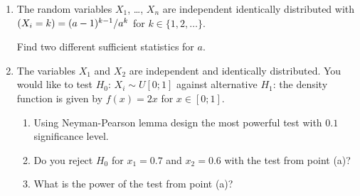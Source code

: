 \documentclass[12pt]{article}
\let\P\relax
\DeclareMathOperator{\P}{\mathbb{P}}
\begin{document}
\begin{enumerate}
\item The random variables $X_1$, \ldots, $X_n$ are independent identically distributed with 
$\P(X_i = k) = (a - 1)^{k-1}/a^k$ for $k \in \{1, 2, \ldots \}$. 

Find two different sufficient statistics for $a$. 

\item The variables $X_1$ and $X_2$ are independent and identically distributed. 
You would like to test $H_0$: $X_i \sim U[0;1]$ against alternative $H_1$: the density function is given by $f(x) = 2x$ for $x \in [0;1]$. 

\begin{enumerate}
  \item Using Neyman-Pearson lemma design the most powerful test with $0.1$ significance level.
  \item Do you reject $H_0$ for $x_1 = 0.7$ and $x_2 = 0.6$ with the test from point (a)?
  \item What is the power of the test from point (a)?
\end{enumerate}

\end{enumerate}
\end{document}
